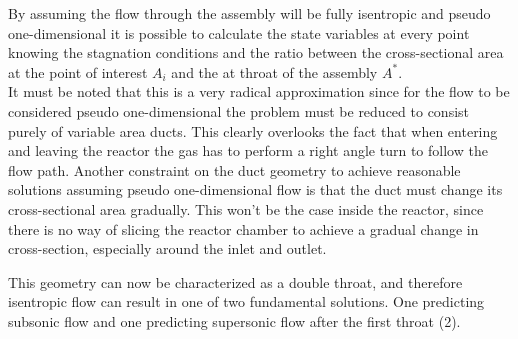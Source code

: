 By assuming the flow through the assembly will be fully isentropic and pseudo one-dimensional it is possible to calculate the state variables at every point knowing the stagnation conditions and the ratio between the cross-sectional area at the point of interest $A_i$ and the at throat of the assembly $A^*$.\\
It must be noted that this is a very radical approximation since for the flow to be  considered pseudo one-dimensional the problem must be reduced to consist purely of variable area ducts.
This clearly overlooks the fact that when entering and leaving the reactor the gas has to perform a right angle turn to follow the flow path.
Another constraint on the duct geometry to achieve reasonable solutions assuming pseudo one-dimensional flow is that the duct must change its cross-sectional area gradually.
\cite{anderson2021modern}
This won't be the case inside the reactor, since there is no way of slicing the reactor chamber to achieve a gradual change in cross-section, especially around the inlet and outlet.

This geometry can now be characterized as a double throat, and therefore isentropic flow can result in one of two fundamental solutions.
One predicting subsonic flow and one predicting supersonic flow after the first throat (2).
\cite{SALAS1986193}
\cite{EMMONS1958}
